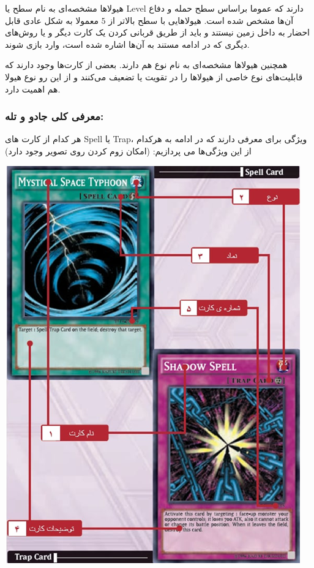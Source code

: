 \documentclass[]{article}
\begin{document}
هیولاها مشخصه‌ای به نام سطح یا Level دارند که عموما براساس سطح حمله و دفاع آن‌ها مشخص شده است. هیولاهایی با سطح بالاتر از $5$ معمولا به شکل عادی قابل احضار به داخل زمین نیستند و باید از طریق قربانی کردن یک کارت دیگر و یا روش‌های دیگری که در ادامه مستند به آن‌ها اشاره شده است، وارد بازی شوند.

همچنین هیولاها مشخصه‌ای به نام نوع هم دارند. بعضی از کارت‌ها وجود دارند که قابلیت‌های نوع خاصی از هیولاها را در تقویت یا تضعیف می‌کنند و از این رو نوع هیولا هم اهمیت دارد.




\subsubsection*{{\titr معرفی کلی جادو و تله:}}

هر کدام از کارت های Spell یا Trap، ویژگی برای معرفی دارند که در ادامه به هرکدام از این ویژگی‌ها می پردازیم: (امکان زوم کردن روی تصویر وجود دارد)



\begin{center}
	\includegraphics[width = 0.25 \textwidth]{Resources/st.png}
	
\end{center}
\end{document}
